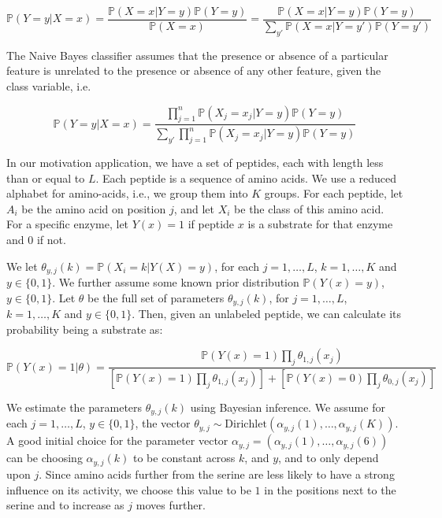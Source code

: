 \documentclass[opre,nonblindrev]{informs3} %
\newcommand{\Prob}{\mathbb{P}}
\newcommand{\Dir}{\mathrm{Dirichlet}}
\begin{document}
\begin{equation*}
\Prob(Y=y|X=x)=\frac{\Prob(X=x|Y=y)\Prob(Y=y)}{\Prob(X=x)}=\frac{\Prob(X=x|Y=y)\Prob(Y=y)}{\sum_{y'}\Prob(X=x|Y=y')\Prob(Y=y')}
\end{equation*}

The Naive Bayes classifier assumes that the presence or absence of a particular feature is unrelated to the presence or absence of any other feature, given the class variable, i.e.

\begin{equation*}
\Prob(Y=y|X=x) = \frac{\prod_{j=1}^n\Prob(X_j=x_j|Y=y)\Prob(Y=y)}{\sum_{y'}\prod_{j=1}^n\Prob(X_j=x_j|Y=y)\Prob(Y=y)}
\end{equation*}

In our motivation application, we have a set of peptides, each with length less than or equal to $L$. Each peptide is a sequence of amino acids. We use a reduced alphabet for amino-acids, i.e., we group them into $K$ groups. For each peptide, let $A_i$ be the amino acid on position $j$, and let $X_i$ be the class of this amino acid. For a specific enzyme, let $Y(x)=1$ if peptide $x$ is a substrate for that enzyme and 0 if not.

We let $\theta_{y,j}(k)=\Prob(X_i=k|Y(X)=y)$, for each $j=1,\ldots,L$, $k=1,\ldots,K$ and $y\in\{0,1\}$. We further assume some known prior distribution $\Prob(Y(x)=y)$, $y\in\{0,1\}$. Let $\theta$ be the full set of parameters $\theta_{y,j}(k)$, for $j=1,\ldots,L$, $k=1,\ldots,K$ and $y\in\{0,1\}$. Then, given an unlabeled peptide, we can calculate its probability being a substrate as:

\begin{equation} \label{eq:model}
  \Prob\left(Y(x) = 1 | \theta\right) =
  \frac{\Prob(Y(x)=1) \prod_{j} \theta_{1,j}(x_j)}{
  \left[ \Prob(Y(x)=1) \prod_{j} \theta_{1,j}(x_j)\right] +
  \left[ \Prob(Y(x)=0) \prod_{j} \theta_{0,j}(x_j)\right]}
\end{equation}

We estimate the parameters $\theta_{y,j}(k)$ using Bayesian inference. We assume for each $j=1,\ldots,L$, $y\in\{0,1\}$, the vector $\theta_{y,j}\sim\Dir(\alpha_{y,j}(1),\ldots,\alpha_{y,j}(K))$. A good initial choice for the parameter vector $\alpha_{y,j} = (\alpha_{y,j}(1),\ldots,\alpha_{y,j}(6))$ can be choosing $\alpha_{y,j}(k)$ to be constant across $k$, and $y$, and to only depend upon $j$. Since amino acids further from the serine are less likely to have a strong influence on its activity, we choose this value to be $1$ in the positions next to the serine and to increase as $j$ moves further.
\end{document}
